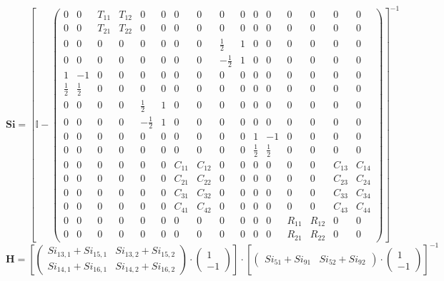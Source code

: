 \[ \mathbf{Si} = \left[ \mathbb{I}  - \left(\begin{smallmatrix} 0 & 0
& T_{11} & T_{12} & 0 & 0 & 0 & 0 & 0 & 0 & 0 & 0 & 0 & 0 & 0 & 0 \\ 0
& 0 & T_{21} & T_{22} & 0 & 0 & 0 & 0 & 0 & 0 & 0 & 0 & 0 & 0 & 0 & 0
\\ 0 & 0 & 0 & 0 & 0 & 0 & 0 & 0 & \frac{1}{2} & 1 & 0 & 0 & 0 & 0 & 0
& 0 \\ 0 & 0 & 0 & 0 & 0 & 0 & 0 & 0 & -\frac{1}{2} & 1 & 0 & 0 & 0 &
0 & 0 & 0 \\ 1 & -1 & 0 & 0 & 0 & 0 & 0 & 0 & 0 & 0 & 0 & 0 & 0 & 0 &
0 & 0 \\ \frac{1}{2} & \frac{1}{2} & 0 & 0 & 0 & 0 & 0 & 0 & 0 & 0 & 0
& 0 & 0 & 0 & 0 & 0 \\ 0 & 0 & 0 & 0 & \frac{1}{2} & 1 & 0 & 0 & 0 & 0
& 0 & 0 & 0 & 0 & 0 & 0 \\ 0 & 0 & 0 & 0 & -\frac{1}{2} & 1 & 0 & 0 &
0 & 0 & 0 & 0 & 0 & 0 & 0 & 0 \\ 0 & 0 & 0 & 0 & 0 & 0 & 0 & 0 & 0 & 0
& 1 & -1 & 0 & 0 & 0 & 0 \\ 0 & 0 & 0 & 0 & 0 & 0 & 0 & 0 & 0 & 0 &
\frac{1}{2} & \frac{1}{2} & 0 & 0 & 0 & 0 \\ 0 & 0 & 0 & 0 & 0 & 0 &
C_{11} & C_{12} & 0 & 0 & 0 & 0 & 0 & 0 & C_{13} & C_{14} \\ 0 & 0 & 0
& 0 & 0 & 0 & C_{21} & C_{22} & 0 & 0 & 0 & 0 & 0 & 0 & C_{23} &
C_{24} \\ 0 & 0 & 0 & 0 & 0 & 0 & C_{31} & C_{32} & 0 & 0 & 0 & 0 & 0
& 0 & C_{33} & C_{34} \\ 0 & 0 & 0 & 0 & 0 & 0 & C_{41} & C_{42} & 0 &
0 & 0 & 0 & 0 & 0 & C_{43} & C_{44} \\ 0 & 0 & 0 & 0 & 0 & 0 & 0 & 0 &
0 & 0 & 0 & 0 & R_{11} & R_{12} & 0 & 0 \\ 0 & 0 & 0 & 0 & 0 & 0 & 0 &
0 & 0 & 0 & 0 & 0 & R_{21} & R_{22} & 0 & 0 \end{smallmatrix}\right)
\right]^{-1} \]
\[ \mathbf{H} = \left[ \left(\begin{smallmatrix} Si_{13,1} + Si_{15,1}
& Si_{13,2} + Si_{15,2} \\ Si_{14,1} + Si_{16,1} & Si_{14,2} +
Si_{16,2} \end{smallmatrix}\right)\cdot \left(\begin{smallmatrix} 1 \\
-1 \end{smallmatrix}\right)\right]\cdot\left[
\left(\begin{smallmatrix} Si_{51} + Si_{91} & Si_{52} + Si_{92}
\end{smallmatrix}\right)\cdot \left(\begin{smallmatrix} 1 \\ -1
\end{smallmatrix}\right)\right]^{-1} \]
